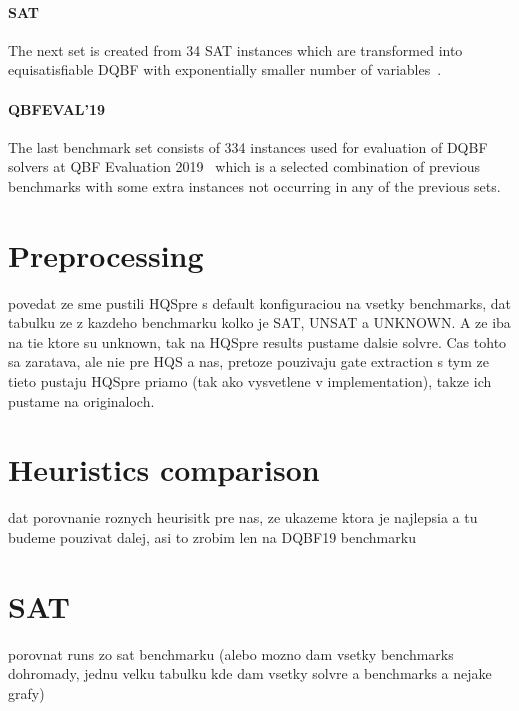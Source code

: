 \documentclass[
  digital, %
  color,
  twoside, %
  table,   %
  nolof,     %
  nolot,     %
]{fithesis3}
\theoremstyle{definition}
\theoremstyle{remark}
\begin{document}
\paragraph{SAT}
The next set is created from 34 SAT instances which are transformed into equisatisfiable DQBF with exponentially smaller number of variables~\cite{SATbenchmarks}.

\paragraph{QBFEVAL'19}
The last benchmark set consists of 334 instances used for evaluation of DQBF solvers at QBF Evaluation 2019~\cite{QBFeval19} which is a selected combination of previous benchmarks with some extra instances not occurring in any of the previous sets.





\section{Preprocessing}
povedat ze sme pustili HQSpre s default konfiguraciou na vsetky benchmarks, dat tabulku ze z kazdeho benchmarku kolko je SAT, UNSAT a UNKNOWN. A ze iba na tie ktore su unknown, tak na HQSpre results pustame dalsie solvre. Cas tohto sa zaratava, ale nie pre HQS a nas, pretoze pouzivaju gate extraction s tym ze tieto pustaju HQSpre priamo (tak ako vysvetlene v implementation), takze ich pustame na originaloch. 

\section{Heuristics comparison}
dat porovnanie roznych heurisitk pre nas, ze ukazeme ktora je najlepsia a tu budeme pouzivat dalej, asi to zrobim len na DQBF19 benchmarku

\section{SAT}
porovnat runs zo sat benchmarku (alebo mozno dam vsetky benchmarks dohromady, jednu velku tabulku kde dam vsetky solvre a benchmarks a nejake grafy)
\end{document}
